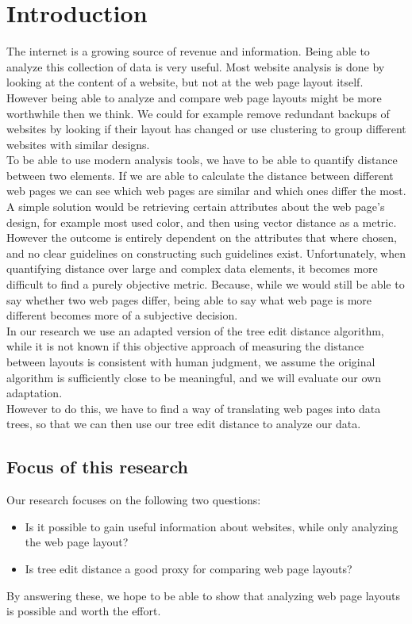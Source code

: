 \chapter{Introduction}\label{introduction}
The internet is a growing source of revenue and information. Being able to analyze this collection of data is very useful. Most website analysis is done by looking at the content of a website, but not at the web page layout itself. However being able to analyze and compare web page layouts might be more worthwhile then we think. We could for example remove redundant backups of websites by looking if their layout has changed or use clustering to group different websites with similar designs.
\\ To be able to use modern analysis tools, we have to be able to quantify distance between two elements. If we are able to calculate the distance between different web pages we can see which web pages are similar and which ones differ the most.
\\ A simple solution would be retrieving certain attributes about the web page's design, for example most used color, and then using vector distance as a metric. However the outcome is entirely dependent on the attributes that where chosen, and no clear guidelines on constructing such guidelines exist. Unfortunately, when quantifying distance over large and complex data elements, it becomes more difficult to find a purely objective metric. Because, while we would still be able to say whether two web pages differ, being able to say what web page is more different becomes more of a subjective decision.\\
In our research we use an adapted version of the tree edit distance algorithm, while it is not known if this objective approach of measuring the distance between layouts is consistent with human judgment, we assume the original algorithm is sufficiently close to be meaningful, and we will evaluate our own adaptation.\\
However to do this, we have to find a way of translating web pages into data trees, so that we can then use our tree edit distance to analyze our data.\\
\section{Focus of this research}
Our research focuses on the following two questions:
\begin{itemize}
\item Is it possible to gain useful information about websites, while only analyzing the web page layout?
\item Is tree edit distance a good proxy for comparing web page layouts?
\end{itemize}
By answering these, we hope to be able to show that analyzing web page layouts is possible and worth the effort.